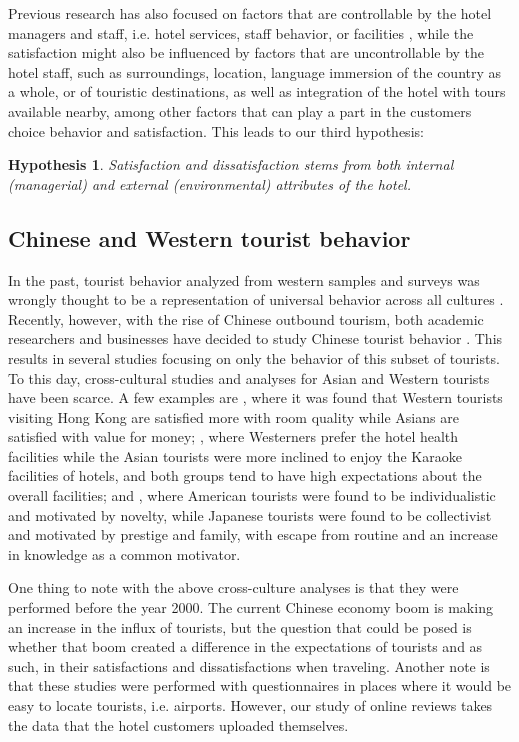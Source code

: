 \documentclass[review]{elsarticle}
\newtheorem{hyp}{Hypothesis}
\begin{document}
Previous research has also focused on factors that are controllable by the hotel managers and staff, i.e. hotel services, staff behavior, or facilities \cite[e.g.][]{shanka2004, choi2001}, while the satisfaction might also be influenced by factors that are uncontrollable by the hotel staff, such as surroundings, location, language immersion of the country as a whole, or of touristic destinations, as well as integration of the hotel with tours available nearby, among other factors that can play a part in the customers choice behavior and satisfaction. 
This leads to our third hypothesis:

\begin{hyp}
\label{hyp:3}
Satisfaction and dissatisfaction stems from both internal (managerial) and external (environmental) attributes of the hotel.
\end{hyp}

\subsection{Chinese and Western tourist behavior}\label{theory_zh_en}

In the past, tourist behavior analyzed from western samples and surveys was wrongly thought to be a representation of universal behavior across all cultures \cite[][]{nielsen2017, jones2010WEIRD, guaratne2009, hogan1978biases}. Recently, however, with the rise of Chinese outbound tourism, both academic researchers and businesses have decided to study Chinese tourist behavior \cite[][]{sun2017}. This results in several studies focusing on only the behavior of this subset of tourists. To this day, cross-cultural studies and analyses for Asian and Western tourists have been scarce. A few examples are \cite{choi2000}, where it was found that Western tourists visiting Hong Kong are satisfied more with room quality while Asians are satisfied with value for money; \cite{bauer1993changing}, where Westerners prefer the hotel health facilities while the Asian tourists were more inclined to enjoy the Karaoke facilities of hotels, and both groups tend to have high expectations about the overall facilities; and \cite{kim2000}, where American tourists were found to be individualistic and motivated by novelty, while Japanese tourists were found to be collectivist and motivated by prestige and family, with escape from routine and an increase in knowledge as a common motivator. 

One thing to note with the above cross-culture analyses is that they were performed before the year 2000. The current Chinese economy boom is making an increase in the influx of tourists, but the question that could be posed is whether that boom created a difference in the expectations of tourists and as such, in their satisfactions and dissatisfactions when traveling. Another note is that these studies were performed with questionnaires in places where it would be easy to locate tourists, i.e. airports. However, our study of online reviews takes the data that the hotel customers uploaded themselves.
\end{document}
